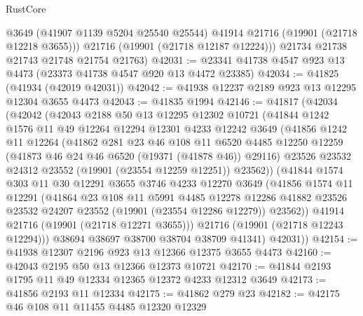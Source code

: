 \begin{lexlean}{RustCore}
\begin{coremodule}
          @3649
          (@41907 @1139 @5204 @25540 @25544)
          @41914
          @21716
          (@19901 (@21718 @12218 @3655)))
        @21716
        (@19901 (@21718 @12187 @12224)))
      @21734
      @21738
      @21743
      @21748
      @21754
      @21763)
@42031 := @23341 @41738 @4547 @923 @13 @4473 (@23373 @41738 @4547 @920 @13 @4472 @23385)
@42034 := @41825 (@41934 (@42019 @42031))
@42042 := @41938 @12237 @2189 @923 @13 @12295 @12304 @3655 @4473
@42043 := @41835 @1994
@42146 := @41817
    (@42034
      (@42042
        (@42043
          @2188
          @50
          @13
          @12295
          @12302
          @10721
          (@41844
            @1242
            @1576
            @11
            @49
            @12264
            @12294
            @12301
            @4233
            @12242
            @3649
            (@41856
              @1242
              @11
              @12264
              (@41862
                @281
                @23
                @46
                @108
                @11
                @6520
                @4485
                @12250
                @12259
                (@41873 @46 @24 @46 @6520 (@19371 (@41878 @46)) @29116)
                @23526
                @23532
                @24312
                @23552
                (@19901 (@23554 @12259 @12251))
                @23562))
            (@41844
              @1574
              @303
              @11
              @30
              @12291
              @3655
              @3746
              @4233
              @12270
              @3649
              (@41856
                @1574
                @11
                @12291
                (@41864
                  @23
                  @108
                  @11
                  @5991
                  @4485
                  @12278
                  @12286
                  @41882
                  @23526
                  @23532
                  @24207
                  @23552
                  (@19901 (@23554 @12286 @12279))
                  @23562))
              @41914
              @21716
              (@19901 (@21718 @12271 @3655)))
            @21716
            (@19901 (@21718 @12243 @12294)))
          @38694
          @38697
          @38700
          @38704
          @38709
          @41341)
        @42031))
@42154 := @41938 @12307 @2196 @923 @13 @12366 @12375 @3655 @4473
@42160 := @42043 @2195 @50 @13 @12366 @12373 @10721
@42170 := @41844 @2193 @1795 @11 @49 @12334 @12365 @12372 @4233 @12312 @3649
@42173 := @41856 @2193 @11 @12334
@42175 := @41862 @279 @23
@42182 := @42175 @46 @108 @11 @11455 @4485 @12320 @12329

\end{coremodule}
\end{lexlean}
